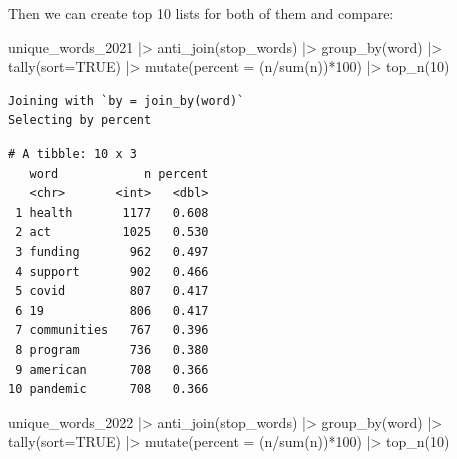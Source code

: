 \documentclass[
  letterpaper,
  DIV=11,
  numbers=noendperiod]{scrreprt}
\newenvironment{Shaded}{\begin{snugshade}}{\end{snugshade}}
\newcommand{\AttributeTok}[1]{\textcolor[rgb]{0.40,0.45,0.13}{#1}}
\newcommand{\ConstantTok}[1]{\textcolor[rgb]{0.56,0.35,0.01}{#1}}
\newcommand{\DecValTok}[1]{\textcolor[rgb]{0.68,0.00,0.00}{#1}}
\newcommand{\FunctionTok}[1]{\textcolor[rgb]{0.28,0.35,0.67}{#1}}
\newcommand{\NormalTok}[1]{\textcolor[rgb]{0.00,0.23,0.31}{#1}}
\newcommand{\SpecialCharTok}[1]{\textcolor[rgb]{0.37,0.37,0.37}{#1}}
\begin{document}
Then we can create top 10 lists for both of them and compare:

\begin{Shaded}
\begin{Highlighting}[]
\NormalTok{unique\_words\_2021 }\SpecialCharTok{|\textgreater{}}
  \FunctionTok{anti\_join}\NormalTok{(stop\_words) }\SpecialCharTok{|\textgreater{}}
  \FunctionTok{group\_by}\NormalTok{(word) }\SpecialCharTok{|\textgreater{}}
  \FunctionTok{tally}\NormalTok{(}\AttributeTok{sort=}\ConstantTok{TRUE}\NormalTok{) }\SpecialCharTok{|\textgreater{}}
  \FunctionTok{mutate}\NormalTok{(}\AttributeTok{percent =}\NormalTok{ (n}\SpecialCharTok{/}\FunctionTok{sum}\NormalTok{(n))}\SpecialCharTok{*}\DecValTok{100}\NormalTok{) }\SpecialCharTok{|\textgreater{}}
  \FunctionTok{top\_n}\NormalTok{(}\DecValTok{10}\NormalTok{)}
\end{Highlighting}
\end{Shaded}

\begin{verbatim}
Joining with `by = join_by(word)`
Selecting by percent
\end{verbatim}

\begin{verbatim}
# A tibble: 10 x 3
   word            n percent
   <chr>       <int>   <dbl>
 1 health       1177   0.608
 2 act          1025   0.530
 3 funding       962   0.497
 4 support       902   0.466
 5 covid         807   0.417
 6 19            806   0.417
 7 communities   767   0.396
 8 program       736   0.380
 9 american      708   0.366
10 pandemic      708   0.366
\end{verbatim}

\begin{Shaded}
\begin{Highlighting}[]
\NormalTok{unique\_words\_2022 }\SpecialCharTok{|\textgreater{}}
  \FunctionTok{anti\_join}\NormalTok{(stop\_words) }\SpecialCharTok{|\textgreater{}}
  \FunctionTok{group\_by}\NormalTok{(word) }\SpecialCharTok{|\textgreater{}}
  \FunctionTok{tally}\NormalTok{(}\AttributeTok{sort=}\ConstantTok{TRUE}\NormalTok{) }\SpecialCharTok{|\textgreater{}}
  \FunctionTok{mutate}\NormalTok{(}\AttributeTok{percent =}\NormalTok{ (n}\SpecialCharTok{/}\FunctionTok{sum}\NormalTok{(n))}\SpecialCharTok{*}\DecValTok{100}\NormalTok{) }\SpecialCharTok{|\textgreater{}}
  \FunctionTok{top\_n}\NormalTok{(}\DecValTok{10}\NormalTok{)}
\end{Highlighting}
\end{Shaded}
\end{document}
